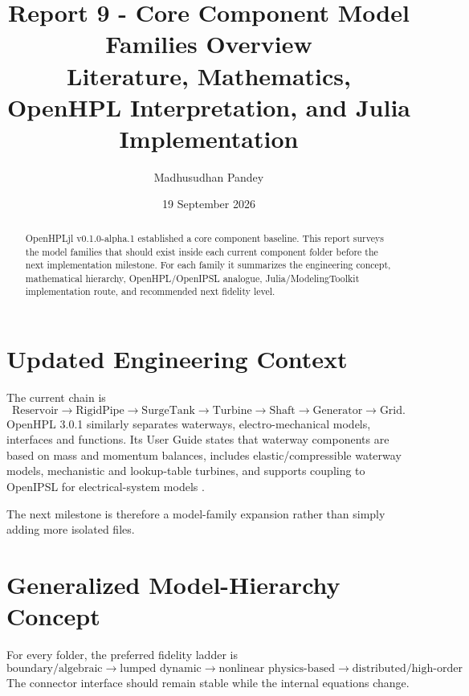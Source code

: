\documentclass[10pt,a4paper]{article}
\title{Report 9 - Core Component Model Families Overview\\
\large Literature, Mathematics, OpenHPL Interpretation, and Julia Implementation}
\author{Madhusudhan Pandey}
\date{19 September 2026}
\begin{document}
\maketitle

\begin{abstract}
OpenHPLjl v0.1.0-alpha.1 established a core component baseline. This report surveys the model families that should exist inside each current component folder before the next implementation milestone. For each family it summarizes the engineering concept, mathematical hierarchy, OpenHPL/OpenIPSL analogue, Julia/ModelingToolkit implementation route, and recommended next fidelity level.
\end{abstract}

\section{Updated Engineering Context}
The current chain is
\[
\boxed{\text{Reservoir}\rightarrow\text{RigidPipe}\rightarrow\text{SurgeTank}
\rightarrow\text{Turbine}\rightarrow\text{Shaft}\rightarrow\text{Generator}\rightarrow\text{Grid}}.
\]
OpenHPL 3.0.1 similarly separates waterways, electro-mechanical models, interfaces and functions. Its User Guide states that waterway components are based on mass and momentum balances, includes elastic/compressible waterway models, mechanistic and lookup-table turbines, and supports coupling to OpenIPSL for electrical-system models \cite{OpenHPLGuide}.

The next milestone is therefore a model-family expansion rather than simply adding more isolated files.

\section{Generalized Model-Hierarchy Concept}
For every folder, the preferred fidelity ladder is
\[
\boxed{\text{boundary/algebraic}\rightarrow\text{lumped dynamic}
\rightarrow\text{nonlinear physics-based}\rightarrow\text{distributed/high-order}}.
\]
The connector interface should remain stable while the internal equations change.
\end{document}
